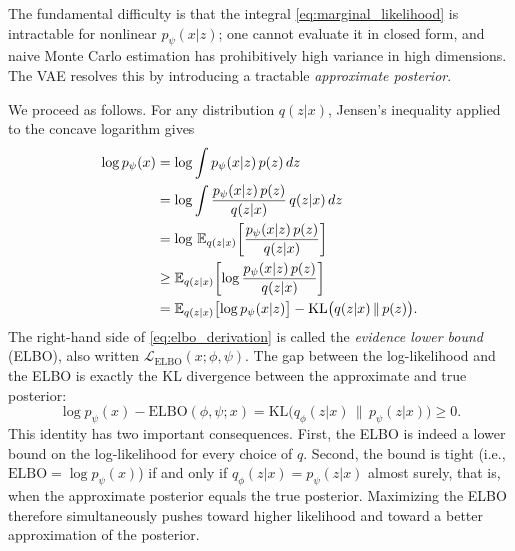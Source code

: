The fundamental difficulty is that the integral \eqref{eq:marginal_likelihood}
is intractable for nonlinear $p_\psi(x | z)$; one cannot evaluate it in
closed form, and naive Monte Carlo estimation has prohibitively high variance
in high dimensions. The VAE resolves this by introducing a tractable
\emph{approximate posterior}.

We proceed as follows. For any distribution $q(z | x)$, Jensen's inequality applied to the concave
logarithm gives
\begin{align}
    \log p_\psi(x) 
    &= \log \int p_\psi(x | z) \, p(z) \, dz \notag \\
    &= \log \int \frac{p_\psi(x | z) \, p(z)}{q(z | x)} \, q(z | x) \, dz \notag \\
    &= \log \, \mathbb{E}_{q(z | x)}\!\left[\frac{p_\psi(x | z) \, p(z)}{q(z | x)}\right] \notag \\
    &\geq \mathbb{E}_{q(z | x)}\!\left[\log \frac{p_\psi(x | z) \, p(z)}{q(z | x)}\right] \notag \\
    &= \mathbb{E}_{q(z | x)}\bigl[\log p_\psi(x | z)\bigr] 
       - \text{KL}\bigl(q(z | x) \,\|\, p(z)\bigr).
    \label{eq:elbo_derivation}
\end{align}
The right-hand side of \eqref{eq:elbo_derivation} is called the \emph{evidence lower 
bound} (ELBO), also written $\mathcal{L}_{\mathrm{ELBO}}(x; \phi, \psi)$. 
The gap between the log-likelihood and the ELBO is exactly the KL divergence 
between the approximate and true posterior:
\begin{equation}
    \log p_\psi(x) - \mathrm{ELBO}(\phi, \psi; x) 
    = \text{KL}\bigl(q_\phi(z | x) \,\|\, p_\psi(z | x)\bigr) \geq 0.
    \label{eq:elbo_gap}
\end{equation}
This identity has two 
important consequences. First, the ELBO is indeed a lower bound on the 
log-likelihood for every choice of $q$. Second, the bound is tight (i.e., 
$\mathrm{ELBO} = \log p_\psi(x)$) if and only if $q_\phi(z | x) = 
p_\psi(z | x)$ almost surely, that is, when the approximate posterior 
equals the true posterior. Maximizing the ELBO therefore simultaneously pushes 
toward higher likelihood and toward a better approximation of the posterior. 

